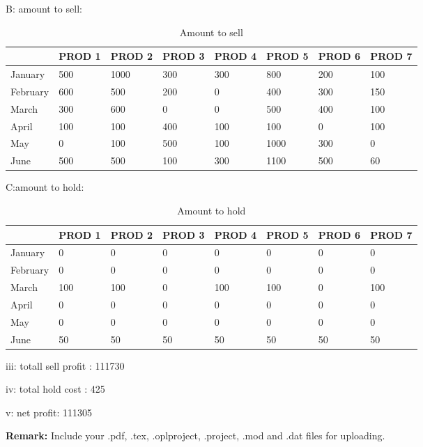 \documentclass[12pt,a4paper]{article}
\makeatletter
\newtheorem*{solution}{Solution}
\theoremstyle{definition}
\renewenvironment{solution}[1][Solution] {\par\pushQED{\qed}\normalfont\topsep6\p@\@plus6\p@\relax\trivlist\item[\hskip\labelsep\bfseries#1\@addpunct{.}]\ignorespaces}{\popQED\endtrivlist\@endpefalse} \makeatother
\makeatother
\begin{document}
\begin{solution}
  B: amount to sell:

 
  \begin{table}[htbp]
	\scriptsize
	\centering
	\renewcommand\arraystretch{1.1}
	\begin{tabular}{m{} m{}<{\centering} m{}<{\centering} m{}<{\centering} m{}<{\centering} m{}<{\centering} m{}<{\centering} m{}<{\centering}}
		\hline
		& \textbf{PROD 1} & \textbf{PROD 2} & \textbf{PROD 3} & \textbf{PROD 4} & \textbf{PROD 5} & \textbf{PROD 6} &  \textbf{PROD 7} \\\hline
		January & 500 & 1000 & 300   & 300  & 800  & 200 & 100 \\
		February& 600 & 500 & 200   & 0    & 400   & 300 & 150 \\
		March & 300   & 600 & 0    & 0     & 500   & 400 & 100 \\
		April & 100   & 100 & 400   & 100   & 100  & 0   & 100 \\
		May & 0       & 100 & 500   & 100   & 1000 & 300 & 0 \\
		June & 500   & 500 & 100    & 300   & 1100 & 500 & 60 \\
		\hline
	\end{tabular}
	\caption{Amount to sell}
\end{table}


  C:amount to hold:

  
  \begin{table}[htbp]
	\scriptsize
	\centering
	\renewcommand\arraystretch{1.1}
	\begin{tabular}{m{} m{}<{\centering} m{}<{\centering} m{}<{\centering} m{}<{\centering} m{}<{\centering} m{}<{\centering} m{}<{\centering}}
		\hline
		& \textbf{PROD 1} & \textbf{PROD 2} & \textbf{PROD 3} & \textbf{PROD 4} & \textbf{PROD 5} & \textbf{PROD 6} &  \textbf{PROD 7} \\\hline
		January &0 &0  & 0  & 0  & 0  &0  &  0\\
		February& 0& 0 &  0 & 0  &  0 & 0 &  0\\
		March &100 & 100 & 0  & 100  & 100  & 0 & 100 \\
		April& 0&  0&  0 &  0 &  0 & 0 &  0\\
		May & 0&  0&  0 &  0 &  0 & 0 &  0\\
		June & 50&  50&  50 & 50  & 50  & 50 & 50 \\
		\hline
	\end{tabular}
	\caption{Amount to hold}
\end{table}

  



  iii: totall sell profit : 111730


  iv: total hold cost : 425

  v: net profit: 111305


\end{solution}



\textbf{Remark:} Include your .pdf, .tex, .oplproject, .project, .mod and .dat files for uploading.


\end{document}
